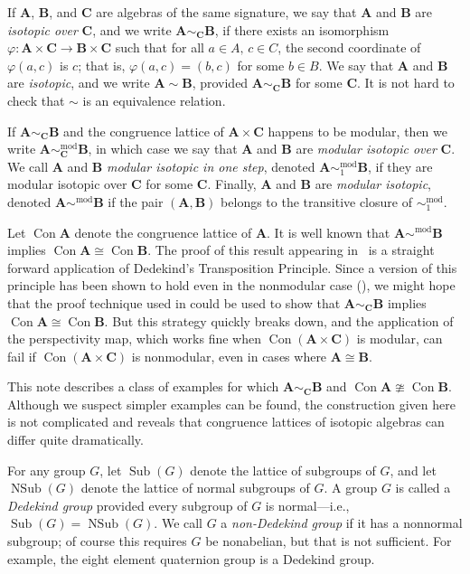 \documentclass{au}
\theoremstyle{plain}
\newcommand{\<}{\ensuremath{\langle}}
\renewcommand{\>}{\ensuremath{\rangle}}
\renewcommand{\phi}{\ensuremath{\varphi}}
\newcommand{\bA}{\ensuremath{\mathbf{A}}}
\newcommand{\bB}{\ensuremath{\mathbf{B}}}
\newcommand{\bC}{\ensuremath{\mathbf{C}}}
\newcommand{\Con}{\ensuremath{\operatorname{Con}}}
\newcommand{\Sub}{\ensuremath{\operatorname{Sub}}}
\newcommand{\NSub}{\ensuremath{\operatorname{NSub}}}
\renewcommand{\phi}{\ensuremath{\varphi}}
\begin{document}
If $\bA$, $\bB$, and $\bC$ are algebras of the same signature, we say that
$\bA$ and $\bB$ are \emph{isotopic over} $\bC$, and we write $\bA\sim_{\bC}\bB$,
if there exists an isomorphism $\phi: \bA \times \bC \rightarrow \bB \times \bC$ such that 
for all $a\in A,\, c\in C$, the second coordinate of $\phi(a,c)$ is $c$; that
is, $\phi(a,c) = (b,c)$ for some $b\in B$.
We say that $\bA$ and $\bB$ are \emph{isotopic}, and we write $\bA\sim \bB$, provided
$\bA\sim_{\bC}\bB$ for some $\bC$.  It is not hard to check that $\sim$ is an
equivalence relation.

If $\bA\sim_{\bC}\bB$ and the congruence lattice of $\bA \times \bC$ happens to
be modular, then we write $\bA \sim^{\mathrm{mod}}_{\bC} \bB$, in which case we say that
$\bA$ and $\bB$ are \emph{modular isotopic over} $\bC$.
We call $\bA$ and $\bB$ \emph{modular isotopic in one step},  denoted 
$\bA \sim^{\mathrm{mod}}_1 \bB$,
if they are modular isotopic over $\bC$ for some $\bC$. Finally, 
$\bA$ and $\bB$ are \emph{modular isotopic}, denoted 
$\bA \sim^{\mathrm{mod}} \bB$ if the pair $(\bA, \bB)$ belongs to the transitive
closure of $\sim^{\mathrm{mod}}_1$.

Let $\Con \bA$ denote the congruence lattice of $\bA$.  It is well known that
$\bA \sim^{\mathrm{mod}} \bB$ implies $\Con \bA \cong \Con \bB$.  The proof
of this result appearing in~\cite{alvi:1987} 
is a straight forward application of Dedekind's Transposition Principle.  
Since a version of this principle has been shown to 
hold even in the nonmodular case (\cite{DTP}), we might hope that the
proof technique used in \cite{alvi:1987} could be used to show that  
$\bA\sim_{\bC}\bB$ implies $\Con \bA \cong \Con \bB$.  But this strategy quickly
breaks down, and the application of the perspectivity map, which works fine when
$\Con (\bA\times \bC)$ is modular, can fail if
$\Con (\bA\times \bC)$ is nonmodular, even in cases where $\bA \cong \bB$. 

This note describes a class of examples for which $\bA\sim_{\bC}\bB$ and $\Con \bA
\ncong \Con \bB$. Although we suspect simpler examples can be found, the
construction given here is not complicated and reveals that congruence lattices of
isotopic algebras can differ quite dramatically.

For any group $G$, let $\Sub(G)$ denote the lattice of subgroups of $G$, and
let $\NSub(G)$ denote the lattice of normal subgroups of $G$.
A group $G$ is called a \emph{Dedekind group} provided every subgroup of $G$ is
normal---i.e., $\Sub(G) = \NSub(G)$.  
We call $G$ a \emph{non-Dedekind group} if it has a nonnormal subgroup; of
course this requires $G$ be nonabelian, but that is not
sufficient.  For example, the eight element quaternion group 
is a Dedekind group.
\end{document}
